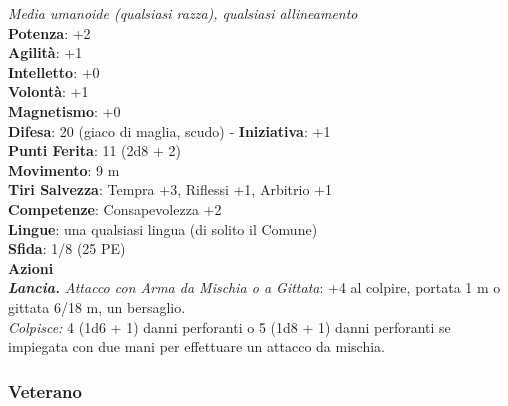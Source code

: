 \begin{multicols}{2}
\emph{Media umanoide (qualsiasi razza), qualsiasi allineamento}\\
\textbf{Potenza}: +2\\
\textbf{Agilità}: +1\\
\textbf{Intelletto}: +0\\
\textbf{Volontà}: +1\\
\textbf{Magnetismo}: +0\\
\textbf{Difesa}: 20 (giaco di maglia, scudo) - \textbf{Iniziativa}: +1\\
\textbf{Punti Ferita}: 11 (2d8 + 2)\\
\textbf{Movimento}: 9 m\\
\textbf{Tiri Salvezza}: Tempra +3, Riflessi +1, Arbitrio +1 \\
\textbf{Competenze}: Consapevolezza +2\\
\textbf{Lingue}: una qualsiasi lingua (di solito il Comune)\\
\textbf{Sfida}: 1/8 (25 PE)\smallskip\\
\smallskip\textbf{Azioni}\\
\emph{\textbf{Lancia.} Attacco con Arma da Mischia o a Gittata}: +4 al colpire, portata 1 m o gittata 6/18 m, un bersaglio.\\
\emph{Colpisce:} 4 (1d6 + 1) danni perforanti o 5 (1d8 + 1) danni perforanti se impiegata con due mani per effettuare un attacco da mischia.\\

\subsubsection{Veterano}


\end{multicols}
